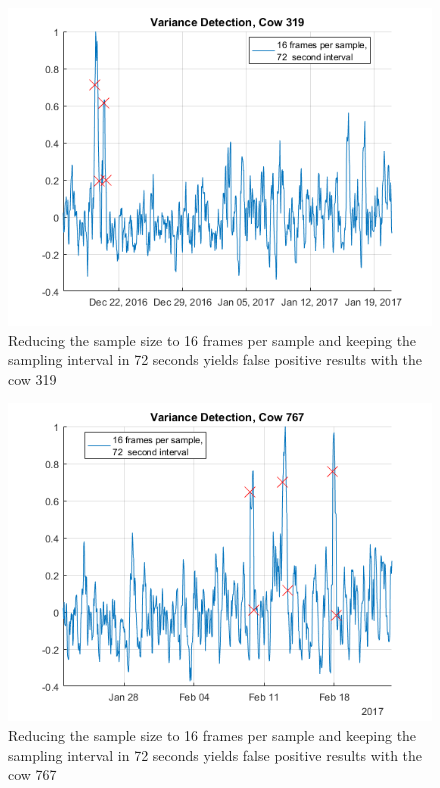 \begin{figure}[h]
\centering
\includegraphics[width = 0.75 \textwidth]{figures/VarianceDetectionCow319_16frames72seconds.png}
\caption{Reducing the sample size to 16 frames per sample and keeping the sampling interval in 72 seconds yields false positive results with the cow 319}
\label{}
\end{figure}

\begin{figure}[h]
\centering
\includegraphics[width = 0.75 \textwidth]{figures/VarianceDetectionCow767_16frames72seconds.png}
\caption{Reducing the sample size to 16 frames per sample and keeping the sampling interval in 72 seconds yields false positive results with the cow 767}
\label{}
\end{figure}


